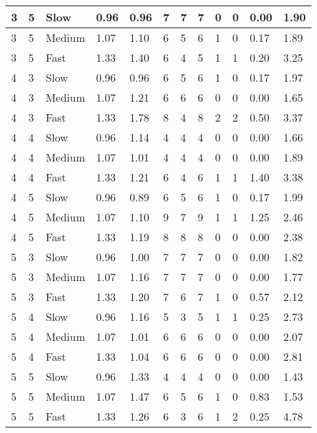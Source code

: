 \documentclass[10pt,fleqn,a4paper]{article}
\begin{document}
{\begin{tabular}{|p{0.5cm}|p{1cm}|p{1.0cm}|p{1.5cm}|p{1.2cm}|p{1.2cm}|p{1.2cm}|p{1.2cm}|p{1.2cm}|p{1.2cm}|p{1.2cm}|p{1.2cm}|}
3 & 5 & Slow & 0.96 & 0.96 & 7 & 7 & 7 & 0 & 0 & 0.00 & 1.90 \\ \hline
3 & 5 & Medium & 1.07 & 1.10 & 6 & 5 & 6 & 1 & 0 & 0.17 & 1.89 \\ \hline
3 & 5 & Fast & 1.33 & 1.40 & 6 & 4 & 5 & 1 & 1 & 0.20 & 3.25 \\ \hline
4 & 3 & Slow & 0.96 & 0.96 & 6 & 5 & 6 & 1 & 0 & 0.17 & 1.97 \\ \hline
4 & 3 & Medium & 1.07 & 1.21 & 6 & 6 & 6 & 0 & 0 & 0.00 & 1.65 \\ \hline
4 & 3 & Fast & 1.33 & 1.78 & 8 & 4 & 8 & 2 & 2 & 0.50 & 3.37 \\ \hline
4 & 4 & Slow & 0.96 & 1.14 & 4 & 4 & 4 & 0 & 0 & 0.00 & 1.66 \\ \hline
4 & 4 & Medium & 1.07 & 1.01 & 4 & 4 & 4 & 0 & 0 & 0.00 & 1.89 \\ \hline
4 & 4 & Fast & 1.33 & 1.21 & 6 & 4 & 6 & 1 & 1 & 1.40 & 3.38 \\ \hline
4 & 5 & Slow & 0.96 & 0.89 & 6 & 5 & 6 & 1 & 0 & 0.17 & 1.99 \\ \hline
4 & 5 & Medium & 1.07 & 1.10 & 9 & 7 & 9 & 1 & 1 & 1.25 & 2.46 \\ \hline
4 & 5 & Fast & 1.33 & 1.19 & 8 & 8 & 8 & 0 & 0 & 0.00 & 2.38 \\ \hline
5 & 3 & Slow & 0.96 & 1.00 & 7 & 7 & 7 & 0 & 0 & 0.00 & 1.82 \\ \hline
5 & 3 & Medium & 1.07 & 1.16 & 7 & 7 & 7 & 0 & 0 & 0.00 & 1.77 \\ \hline
5 & 3 & Fast & 1.33 & 1.20 & 7 & 6 & 7 & 1 & 0 & 0.57 & 2.12 \\ \hline
5 & 4 & Slow & 0.96 & 1.16 & 5 & 3 & 5 & 1 & 1 & 0.25 & 2.73 \\ \hline
5 & 4 & Medium & 1.07 & 1.01 & 6 & 6 & 6 & 0 & 0 & 0.00 & 2.07 \\ \hline
5 & 4 & Fast & 1.33 & 1.04 & 6 & 6 & 6 & 0 & 0 & 0.00 & 2.81 \\ \hline
5 & 5 & Slow & 0.96 & 1.33 & 4 & 4 & 4 & 0 & 0 & 0.00 & 1.43 \\ \hline
5 & 5 & Medium & 1.07 & 1.47 & 6 & 5 & 6 & 1 & 0 & 0.83 & 1.53 \\ \hline
5 & 5 & Fast & 1.33 & 1.26 & 6 & 3 & 6 & 1 & 2 & 0.25 & 4.78 \\ \hline


\end{tabular}
}
\end{document}
